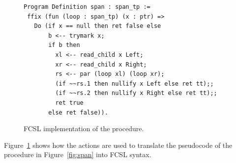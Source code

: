 {
\setlength{\belowcaptionskip}{-10pt} 
\begin{figure}[t]
{\centering 
\begin{lstlisting}[basicstyle=\footnotesize\ttfamily]
Program Definition span : span_tp :=
 ffix (fun (loop : span_tp) (x : ptr) =>
   Do (if x == null then ret false else 
       b <-- trymark x;
       if b then
         xl <-- read_child x Left;
         xr <-- read_child x Right;
         rs <-- par (loop xl) (loop xr);
         (if ~~rs.1 then nullify x Left else ret tt);;
         (if ~~rs.2 then nullify x Right else ret tt);;
         ret true
       else ret false)). 
\end{lstlisting}
}
\caption{FCSL implementation of the  procedure.}
\label{fig:coq-span}
\end{figure}
}

Figure~\ref{fig:coq-span} shows how the actions are used to translate
the pseudocode of the  procedure in Figure~\ref{fig:span}
into FCSL syntax.





